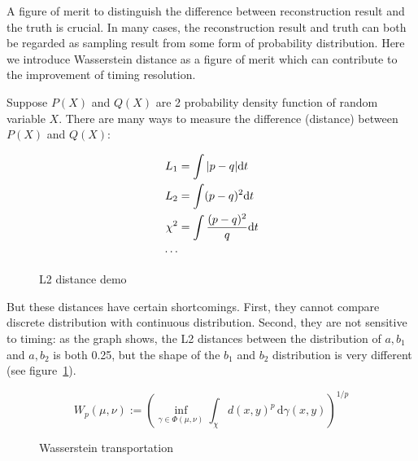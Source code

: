 A figure of merit to distinguish the difference between reconstruction result and the truth is crucial. In many cases, the reconstruction result and truth can both be regarded as sampling result from some form of probability distribution. Here we introduce Wasserstein distance as a figure of merit which can contribute to the improvement of timing resolution. 

Suppose $P(X)$ and $Q(X)$ are 2 probability density function of random variable $X$. There are many ways to measure the difference (distance) between $P(X)$ and $Q(X)$: 

\begin{minipage}{.3\textwidth}
\begin{align*}
    L_{1} &= \int|p-q| \mathrm{d} t \\
    L_{2} &= \int(p-q)^{2} \mathrm{d} t \\
    \chi^{2} &= \int\frac{(p-q)^{2}}{q} \mathrm{d} t \\
    \cdots
\end{align*}
\end{minipage}
\begin{minipage}{.7\textwidth}
\begin{figure}[H]
    \centering
    \scalebox{0.4}{}
    \caption{\label{fig:l2} L2 distance demo}
\end{figure}
\end{minipage}

But these distances have certain shortcomings. First, they cannot compare discrete distribution with continuous distribution. Second, they are not sensitive to timing: as the graph shows, the L2 distances between the distribution of $a,b_{1}$ and $a,b_{2}$ is both 0.25, but the shape of the $b_{1}$ and $b_{2}$ distribution is very different (see figure~\ref{fig:l2}). 

\label{sub:Wasserstein distance}
\begin{minipage}{.45\textwidth}
\begin{equation}
    W_{p}(\mu,\nu):=\left(\inf_{\gamma\in\Phi(\mu,\nu)}\int_{\chi}d(x,y)^{p}\,\mathrm{d}\gamma(x,y)\right)^{1/p} \label{eq:w-dist-def}
\end{equation}
\end{minipage}
\begin{minipage}{.55\textwidth}
\begin{figure}[H]
    \centering
    \scalebox{0.4}{}
    \caption{\label{fig:Wasserstein transportation} Wasserstein transportation}
\end{figure}
\end{minipage}

